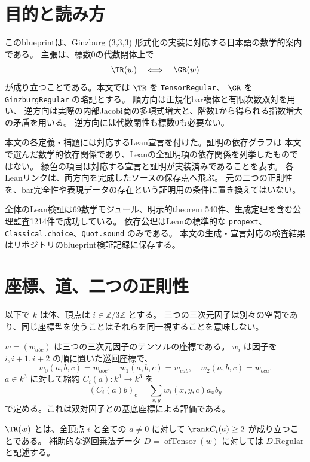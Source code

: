 \section{目的と読み方}

このblueprintは、Ginzburg (3,3,3) 形式化の実装に対応する日本語の数学的案内である。
主張は、標数0の代数閉体上で
\[
  \TR(w)\quad\Longleftrightarrow\quad\GR(w)
\]
が成り立つことである。本文では $\TR$ を \texttt{TensorRegular}、
$\GR$ を \texttt{GinzburgRegular} の略記とする。
順方向は正規化bar複体と有限次数双対を用い、
逆方向は実際の内部Jacobi商の多項式増大と、階数1から得られる指数増大の矛盾を用いる。
逆方向には代数閉性も標数0も必要ない。

本文の各定義・補題には対応するLean宣言を付けた。証明の依存グラフは
本文で選んだ数学的依存関係であり、Leanの全証明項の依存関係を列挙したものではない。
緑色の項目は対応する宣言と証明が実装済みであることを表す。
各Leanリンクは、両方向を完成したソースの保存点へ飛ぶ。
元の二つの正則性を、bar完全性や表現データの存在という証明用の条件に置き換えてはいない。

全体のLean検証は69数学モジュール、明示的theorem 540件、生成定理を含む公理監査1214件で成功している。
依存公理はLeanの標準的な \texttt{propext}、\texttt{Classical.choice}、\texttt{Quot.sound} のみである。
本文の生成・宣言対応の検査結果はリポジトリのblueprint検証記録に保存する。

\section{座標、道、二つの正則性}

以下で $k$ は体、頂点は $i\in\mathbb Z/3\mathbb Z$ とする。
三つの三次元因子は別々の空間であり、同じ座標型を使うことはそれらを同一視することを意味しない。

\begin{definition}[テンソルの巡回座標]\label{def:coordinates}
\leanok
$w=(w_{abc})$ は三つの三次元因子のテンソルの座標である。
$w_i$ は因子を $i,i+1,i+2$ の順に置いた巡回座標で、
\[
 w_0(a,b,c)=w_{abc},\quad w_1(a,b,c)=w_{cab},\quad w_2(a,b,c)=w_{bca}.
\]
$a\in k^3$ に対して縮約 $C_i(a):k^3\to k^3$ を
\[
 (C_i(a)b)_c=\sum_{x,y}w_i(x,y,c)a_x b_y
\]
で定める。これは双対因子との基底座標による評価である。
\end{definition}

\begin{definition}\label{def:tensor-regular}
\leanok
{}
$\TR(w)$ とは、全頂点 $i$ と全ての $a\ne0$ に対して
$\rank C_i(a)\ge2$ が成り立つことである。
補助的な巡回乗法データ $D=\operatorname{ofTensor}(w)$ に対しては $D.\mathrm{Regular}$ と記述する。
\end{definition}

